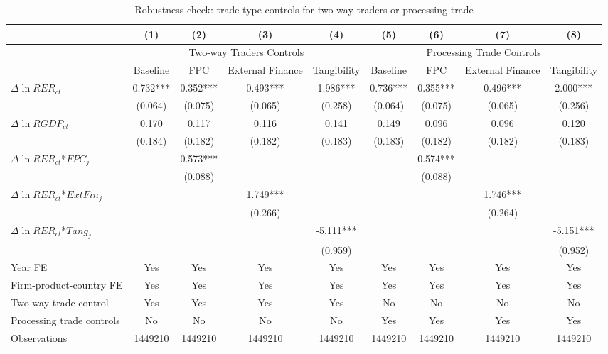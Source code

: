 \begin{table}
	\centering
	\caption{Robustness check: trade type controls for two-way traders or processing trade}
	\begin{threeparttable}
		\begin{tabular}{lcccccccc}
			\toprule
			& (1)   & (2)   & (3)   & (4) &  (5)  &  (6)   & (7)   & (8)\\
			\midrule
			& \multicolumn{4}{c}{Two-way Traders Controls} & \multicolumn{4}{c}{Processing Trade Controls}\\
			& Baseline & FPC & External Finance & Tangibility & Baseline & FPC & External Finance & Tangibility\\
			\midrule
			$\Delta \ln RER_{ct}$ & 0.732*** & 0.352*** & 0.493*** & 1.986*** & 0.736*** & 0.355*** & 0.496*** & 2.000*** \\
			& (0.064) & (0.075) & (0.065) & (0.258) & (0.064) & (0.075) & (0.065) & (0.256) \\
			$\Delta \ln RGDP_{ct}$ & 0.170 & 0.117 & 0.116 & 0.141 & 0.149 & 0.096 & 0.096 & 0.120 \\
			& (0.184) & (0.182) & (0.182) & (0.183) & (0.183) & (0.182) & (0.182) & (0.183) \\
			$\Delta \ln RER_{ct}$*$FPC_{j}$ &   & 0.573*** &       &       &       & 0.574*** &       &  \\
			&   & (0.088) &       &       &       & (0.088) &       &  \\
			$\Delta \ln RER_{ct}$*$ExtFin_{j}$ &    &       & 1.749*** &       &       &       & 1.746*** &  \\
			&     &       & (0.266) &       &       &       & (0.264) &  \\
			$\Delta \ln RER_{ct}$*$Tang_{j}$ &     &       &       & -5.111*** &       &       &       & -5.151*** \\
			&     &       &       & (0.959) &       &       &       & (0.952) \\
			Year FE  &  Yes   & Yes   & Yes   & Yes &  Yes   & Yes   & Yes   & Yes\\
			Firm-product-country FE &  Yes   & Yes   & Yes   & Yes &  Yes   & Yes   & Yes   & Yes\\
			Two-way trade control &  Yes   & Yes   & Yes   & Yes & No & No & No & No\\
			Processing trade controls & No & No & No & No &  Yes   & Yes   & Yes  & Yes \\
			Observations & 1449210 & 1449210 & 1449210 & 1449210 & 1449210 & 1449210 & 1449210 & 1449210\\

\end{tabular}
\end{threeparttable}
\end{table}
